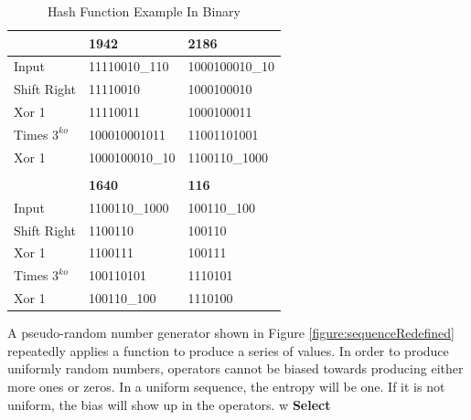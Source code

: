\documentclass[preprint]{sigplanconf}
\begin{document}
\begin{table} [ht]
    \begin{center}
        \begin{tabular}{|l|l|l|}
            \hline
                           & \textbf{1942}             & \textbf{2186}             \\
            \hline
            Input          & 11110010\_110             & \phantom{1}1000100010\_10 \\
            \hline
            Shift Right    & 11110010                  & \phantom{1}1000100010     \\
            \hline
            Xor 1          & 11110011                  & \phantom{1}1000100011     \\
            \hline
            Times $3^{ko}$ & 100010001011              & 11001101001               \\
            \hline
            Xor 1          & 1000100010\_10            & 1100110\_1000             \\
            \hline
                           &                           &                           \\
                           & \textbf{1640}             & \textbf{116}              \\
            \hline
            Input          & \phantom{11}1100110\_1000 & \phantom{1}100110\_100    \\
            \hline
            Shift Right    & \phantom{11}1100110       & \phantom{1}100110         \\
            \hline
            Xor 1          & \phantom{11}1100111       & \phantom{1}100111         \\
            \hline
            Times $3^{ko}$ & 100110101                 & 1110101                   \\
            \hline
            Xor 1          & 100110\_100               & 1110100                   \\
            \hline
        \end{tabular}
        \caption{Hash Function Example In Binary}
        \label{table:hashFunctionExampleInBinary}
    \end{center}
\end{table}

A pseudo-random number generator shown in Figure \ref{figure:sequenceRedefined} repeatedly applies a function to produce a series of values. In order to produce uniformly random numbers, operators cannot be biased towards producing either more ones or zeros. In a uniform sequence, the entropy will be one. If it is not uniform, the bias will show up in the operators.
w
\textbf{Select}
\end{document}
